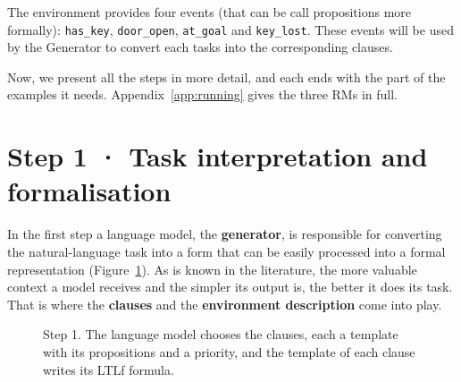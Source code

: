 \documentclass[11pt,english,listoffigures,listoftables]{tfgetsinf}
\begin{document}
The environment provides four events (that can be call propositions more formally): \texttt{has\_key}, \texttt{door\_open}, \texttt{at\_goal} and \texttt{key\_lost}. These events will be used by the Generator to convert each tasks into the corresponding clauses.

Now, we present all the steps in more detail, and each ends with the part of the examples it needs. Appendix~\ref{app:running} gives the three RMs in full.

\section{Step 1 · Task interpretation and formalisation}
\label{sec:step1}
In the first step a language model, the \textbf{generator}, is responsible for converting the natural-language task into a form that can be easily processed into a formal representation (Figure~\ref{fig:step1}). As is known in the literature, the more valuable context a model receives and the simpler its output is, the better it does its task. That is where the \textbf{clauses} and the \textbf{environment description} come into play.

\begin{figure}[H]
\centering
{}
\caption[Step 1 of FARM]{Step 1. The language model chooses the clauses, each a template with its propositions and a priority, and the template of each clause writes its LTLf formula.}
\label{fig:step1}
\end{figure}
\end{document}
